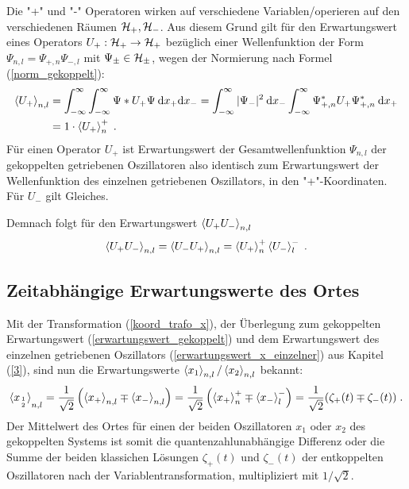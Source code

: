   Die "+" und "-" Operatoren wirken auf verschiedene Variablen/operieren auf den verschiedenen Räumen $\cal H_+,\cal H_-$.
  Aus diesem Grund gilt für den Erwartungswert eines Operators $U_+:\cal H_+ \rightarrow \cal H_+$ bezüglich einer Wellenfunktion der Form $\Psi_{n,l}=\Psi_{+,n}\Psi_{-,l}$ mit $\Psi_\pm \in \cal H_\pm$, wegen der Normierung nach Formel (\ref{norm_gekoppelt}):
  \begin{align}
    \braket{U_+}_{n,l} &= \int_{-\infty}^{\infty}\int_{-\infty}^{\infty} \Psi*U_+\Psi \: \text dx_+ \text dx_-
    = \int_{-\infty}^{\infty} |\Psi_-|^2 \: \text dx_- \int_{-\infty}^{\infty} \Psi_{+,n}^*U_+\Psi_{+,n}^* \: \text dx_+ \notag\\
    &= 1 \cdot \braket{U_+}_n^+ \; .
    \label{erwartungswert_gekoppelt}
  \end{align}
  Für einen Operator $U_+$ ist Erwartungswert der Gesamtwellenfunktion $\Psi_{n,l}$ der gekoppelten getriebenen Oszillatoren also identisch zum Erwartungswert der Wellenfunktion des einzelnen getriebenen Oszillators, in den "+"-Koordinaten.
  Für $U_-$ gilt Gleiches.

  Demnach folgt für den Erwartungswert $\braket{U_+U_-}_{n,l}$
  \begin{equation}
    \braket{U_+U_-}_{n,l}=\braket{U_-U_+}_{n,l} = \braket{U_+}_n^+\braket{U_-}_l^- \; .
    \label{erwartungswert_gekoppelt_produkt}
  \end{equation}


  \subsection{Zeitabhängige Erwartungswerte des Ortes}
    Mit der Transformation (\ref{koord_trafo_x}), der Überlegung zum gekoppelten Erwartungswert (\ref{erwartungswert_gekoppelt}) und dem Erwartungswert des einzelnen getriebenen Oszillators (\ref{erwartungswert_x_einzelner}) aus Kapitel (\ref{3}), sind nun die Erwartungswerte
    $\braket{x_1}_{n,l}/\braket{x_2}_{n,l}$ bekannt:
    \begin{align}
      \braket{x_{1 \atop 2}}_{n,l}=\frac{1}{\sqrt{2}}\left(\braket{x_+}_{n,l}\mp\braket{x_-}_{n,l}\right)
      =\frac{1}{\sqrt{2}}\left(\braket{x_+}_n^+\mp\braket{x_-}_l^-\right)
      =\frac{1}{\sqrt{2}}(\zeta_+(t)\mp\zeta_-(t)) \; .
    \end{align}
    Der Mittelwert des Ortes für einen der beiden Oszillatoren $x_1$ oder $x_2$ des gekoppelten Systems ist somit die quantenzahlunabhängige Differenz oder die Summe der beiden klassichen Lösungen $\zeta_+(t)$ und $\zeta_-(t)$ der entkoppelten Oszillatoren nach der Variablentransformation, multipliziert mit $1/\sqrt 2$.

